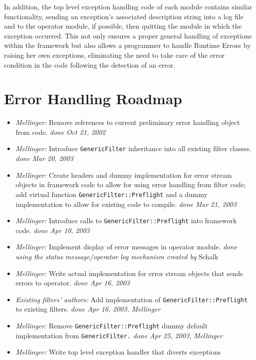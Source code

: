\documentclass[12pt,a4paper]{article}
\begin{document}
In addition, the top level exception handling code
of each module contains similar functionality,
sending an exception's associated description string into
a log file and to the operator module, if possible, then
quitting the module in which the exception occurred.
This not only ensures
a proper general handling of exceptions within the framework but
also allows a programmer to handle {Runtime Errors} by raising
her own exceptions, eliminating the need to take care of the error
condition in the code following the detection of an error.

\pagebreak
\section{Error Handling Roadmap}
\begin{flushleft}
\begin{itemize}
\item \textit{Mellinger:} Remove references to current preliminary error handling
object from code.
  \textit{done Oct 21, 2002}
\item \textit{Mellinger:} Introduce \texttt{GenericFilter} inheritance into all
existing filter classes.
  \textit{done Mar 20, 2003}
\item \textit{Mellinger:} Create headers and dummy implementation for error stream
objects in framework code to allow for using error handling from
filter code; add virtual function \texttt{GenericFilter::Preflight}
and a dummy implementation to allow for existing code to compile.
  \textit{done Mar 21, 2003}
\item \textit{Mellinger:} Introduce calls to \texttt{GenericFilter::Preflight} into
framework code.
  \textit{done Apr 10, 2003}
\item \textit{Mellinger:} Implement display of error messages in operator module.
  \textit{done using the status message/operator log mechanism created by} Schalk 
\item \textit{Mellinger:} Write actual implementation for error stream objects that
sends errors to operator.
  \textit{done Apr 16, 2003}
\item \textit{Existing filters' authors:} Add implementation of \texttt{GenericFilter::Preflight} to existing filters.
  \textit{done Apr 16, 2003, Mellinger}
\item \textit{Mellinger:} Remove \texttt{GenericFilter::Preflight} dummy default implementation from \texttt{GenericFilter.}
  \textit{done Apr 25, 2003, Mellinger}
\item \textit{Mellinger:} Write top level exception handler that diverts exceptions

\end{itemize}
\end{flushleft}
\end{document}
